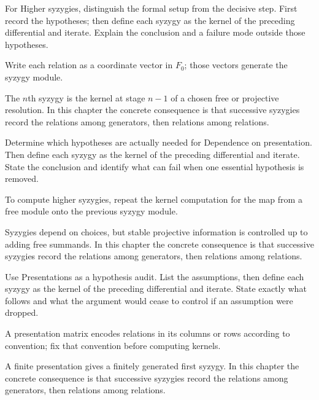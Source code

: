 \begin{exercise}\label{exr:v24-02}
For Higher syzygies, distinguish the formal setup from the decisive step. First record the hypotheses; then define each syzygy as the kernel of the preceding differential and iterate. Explain the conclusion and a failure mode outside those hypotheses.
\end{exercise}
\begin{hint}
Write each relation as a coordinate vector in \(F_0\); those vectors generate the syzygy module.
\end{hint}
\begin{solution}
The $n$th syzygy is the kernel at stage $n-1$ of a chosen free or projective resolution. In this chapter the concrete consequence is that successive syzygies record the relations among generators, then relations among relations.
\end{solution}

\begin{exercise}\label{exr:v24-03}
Determine which hypotheses are actually needed for Dependence on presentation. Then define each syzygy as the kernel of the preceding differential and iterate. State the conclusion and identify what can fail when one essential hypothesis is removed.
\end{exercise}
\begin{hint}
To compute higher syzygies, repeat the kernel computation for the map from a free module onto the previous syzygy module.
\end{hint}
\begin{solution}
Syzygies depend on choices, but stable projective information is controlled up to adding free summands. In this chapter the concrete consequence is that successive syzygies record the relations among generators, then relations among relations.
\end{solution}

\begin{exercise}\label{exr:v24-04}
Use Presentations as a hypothesis audit. List the assumptions, then define each syzygy as the kernel of the preceding differential and iterate. State exactly what follows and what the argument would cease to control if an assumption were dropped.
\end{exercise}
\begin{hint}
A presentation matrix encodes relations in its columns or rows according to convention; fix that convention before computing kernels.
\end{hint}
\begin{solution}
A finite presentation gives a finitely generated first syzygy. In this chapter the concrete consequence is that successive syzygies record the relations among generators, then relations among relations.
\end{solution}

